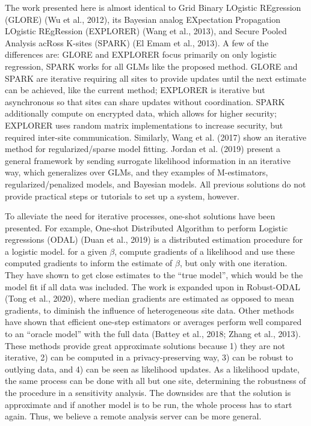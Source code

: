 \documentclass[]{elsarticle} %
\begin{document}
The work presented here is almost identical to Grid Binary LOgistic
REgression (GLORE) (Wu et al., 2012), its Bayesian analog EXpectation
Propagation LOgistic REgRession (EXPLORER) (Wang et al., 2013), and
Secure Pooled Analysis acRoss K-sites (SPARK) (El Emam et al., 2013). A
few of the differences are: GLORE and EXPLORER focus primarily on only
logistic regression, SPARK works for all GLMs like the proposed method.
GLORE and SPARK are iterative requiring all sites to provide updates
until the next estimate can be achieved, like the current method;
EXPLORER is iterative but asynchronous so that sites can share updates
without coordination. SPARK additionally compute on encrypted data,
which allows for higher security; EXPLORER uses random matrix
implementations to increase security, but required inter-site
communication. Similarly, Wang et al. (2017) show an iterative method
for regularized/sparse model fitting. Jordan et al. (2019) present a
general framework by sending surrogate likelihood information in an
iterative way, which generalizes over GLMs, and they examples of
M-estimators, regularized/penalized models, and Bayesian models. All
previous solutions do not provide practical steps or tutorials to set up
a system, however.

To alleviate the need for iterative processes, one-shot solutions have
been presented. For example, One-shot Distributed Algorithm to perform
Logistic regressions (ODAL) (Duan et al., 2019) is a distributed
estimation procedure for a logistic model. for a given \(\beta\),
compute gradients of a likelihood and use these computed gradients to
inform the estimate of \(\beta\), but only with one iteration. They have
shown to get close estimates to the ``true model'', which would be the
model fit if all data was included. The work is expanded upon in
Robust-ODAL (Tong et al., 2020), where median gradients are estimated as
opposed to mean gradients, to diminish the influence of heterogeneous
site data. Other methods have shown that efficient one-step estimators
or averages perform well compared to an ``oracle model'' with the full
data (Battey et al., 2018; Zhang et al., 2013). These methods provide
great approximate solutions because 1) they are not iterative, 2) can be
computed in a privacy-preserving way, 3) can be robust to outlying data,
and 4) can be seen as likelihood updates. As a likelihood update, the
same process can be done with all but one site, determining the
robustness of the procedure in a sensitivity analysis. The downsides are
that the solution is approximate and if another model is to be run, the
whole process has to start again. Thus, we believe a remote analysis
server can be more general.
\end{document}
